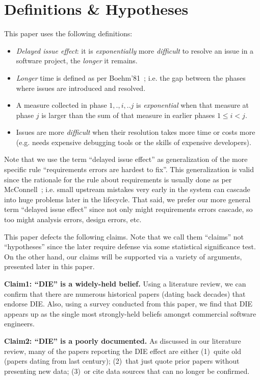 \documentclass{sig-alternate}
\newcommand{\bi}{\begin{itemize}}%
\newcommand{\ei}{\end{itemize}}
\begin{document}
\section{Definitions \& Hypotheses}
This paper uses the following definitions:
\bi
\item
{\em Delayed issue effect}:   it is {\em exponentially}  more {\em difficult} to resolve an issue in a software project, the {\em longer} it remains.
\item
 {\em Longer} time is defined as per  Boehm'81~\cite{Boehm81}; i.e. the gap between the   phases where   issues are introduced and resolved.
\item
A measure collected in phase ${1,.,i,..j}$ is 
{\em exponential} when  that
   measure at phase $j$   
   is larger than the sum of that measure in 
earlier phases $1 \le i < j$. 
\item
Issues are more {\em difficult}  
when their resolution takes more time or costs more  (e.g. needs expensive
debugging tools or the skills of expensive developers).
\ei
Note that we use  the  term ``delayed issue effect'' as generalization of the
more specific rule  ``requirements errors are hardest to fix''.
This generalization is valid since the rationale for the rule about requirements
is usually done as per McConnell~\cite{mcconnell01}; i.e. small upstream mistakes very
early in the system can cascade into huge problems later in the lifecycle.
That said, we prefer our more general term ``delayed issue effect'' since not
only might requirements errors cascade, so too might analysis errors, design errors, etc.



This paper defects the  following claims. Note that we call them
``claims'' not ``hypotheses'' since the later require defense via some statistical
significance test. On the other hand, our claims will be supported via a variety
of arguments, presented later in this paper.

{\bf  Claim1: ``DIE'' is a  widely-held belief.}
Using a literature review, we can confirm that there are numerous historical papers (dating back decades)
that endorse DIE. Also, using a survey conducted from this paper, we find  that 
  DIE  appears up as the
single most strongly-held beliefs amongst commercial software engineers.

{\bf  Claim2: ``DIE'' is a poorly documented.}
 As discussed in our literature review,  many of the papers reporting the DIE
effect are either (1)~quite old (papers dating from last century);
(2)~that just quote prior papers without presenting   new data; 
(3)~or cite data sources that can no longer be
confirmed. 
\end{document}
